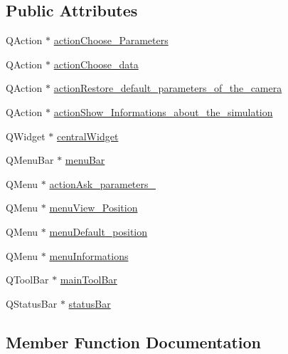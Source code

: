 \subsection*{Public Attributes}
\begin{DoxyCompactItemize}
\item 
Q\+Action $\ast$ \hyperlink{class_ui___main_window_a01dc6ef8ed9c1a2ade1b6cda5f441c0a}{action\+Choose\+\_\+\+Parameters}
\item 
Q\+Action $\ast$ \hyperlink{class_ui___main_window_a74d62fabdcffd1597d0df9c7688fac25}{action\+Choose\+\_\+data}
\item 
Q\+Action $\ast$ \hyperlink{class_ui___main_window_a228d60e79ec7346a14f4de979c05eaed}{action\+Restore\+\_\+default\+\_\+parameters\+\_\+of\+\_\+the\+\_\+camera}
\item 
Q\+Action $\ast$ \hyperlink{class_ui___main_window_ae562a7f5f12d3c91dd91992c0a36ef35}{action\+Show\+\_\+\+Informations\+\_\+about\+\_\+the\+\_\+simulation}
\item 
Q\+Widget $\ast$ \hyperlink{class_ui___main_window_a30075506c2116c3ed4ff25e07ae75f81}{central\+Widget}
\item 
Q\+Menu\+Bar $\ast$ \hyperlink{class_ui___main_window_a2be1c24ec9adfca18e1dcc951931457f}{menu\+Bar}
\item 
Q\+Menu $\ast$ \hyperlink{class_ui___main_window_aac5d8ae11f873406a74687ee5f691715}{action\+Ask\+\_\+parameters\+\_}
\item 
Q\+Menu $\ast$ \hyperlink{class_ui___main_window_a2d1b019089ba5bd006a53d925168444e}{menu\+View\+\_\+\+Position}
\item 
Q\+Menu $\ast$ \hyperlink{class_ui___main_window_a5c5d8a3ce3a66bcfa127ce419a00ab3b}{menu\+Default\+\_\+position}
\item 
Q\+Menu $\ast$ \hyperlink{class_ui___main_window_a349ea71defdb75b5832851ebf6acaae8}{menu\+Informations}
\item 
Q\+Tool\+Bar $\ast$ \hyperlink{class_ui___main_window_a5172877001c8c7b4e0f6de50421867d1}{main\+Tool\+Bar}
\item 
Q\+Status\+Bar $\ast$ \hyperlink{class_ui___main_window_a50fa481337604bcc8bf68de18ab16ecd}{status\+Bar}
\end{DoxyCompactItemize}


\subsection{Member Function Documentation}
\hypertarget{class_ui___main_window_a097dd160c3534a204904cb374412c618}{}\label{class_ui___main_window_a097dd160c3534a204904cb374412c618} 
